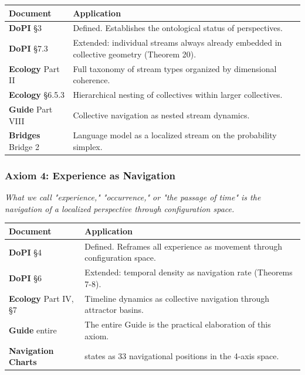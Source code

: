 \begin{longtable}{>{\raggedright\arraybackslash}p{} >{\raggedright\arraybackslash}p{}}
\toprule
\textbf{Document} & \textbf{Application} \\
\midrule
\endhead
\textbf{DoPI} §3 & Defined. Establishes the ontological status of perspectives. \\
\textbf{DoPI} §7.3 & Extended: individual streams always already embedded in collective geometry (Theorem 20). \\
\textbf{Ecology} Part II & Full taxonomy of stream types organized by dimensional coherence. \\
\textbf{Ecology} §6.5.3 & Hierarchical nesting of collectives within larger collectives. \\
\textbf{Guide} Part VIII & Collective navigation as nested stream dynamics. \\
\textbf{Bridges} Bridge 2 & Language model as a localized stream on the probability simplex. \\
\bottomrule
\end{longtable}



\subsubsection*{Axiom 4: Experience as Navigation}


\textit{What we call "experience," "occurrence," or "the passage of time" is the navigation of a localized perspective through configuration space.}



\begin{longtable}{>{\raggedright\arraybackslash}p{} >{\raggedright\arraybackslash}p{}}
\toprule
\textbf{Document} & \textbf{Application} \\
\midrule
\endhead
\textbf{DoPI} §4 & Defined. Reframes all experience as movement through configuration space. \\
\textbf{DoPI} §6 & Extended: temporal density as navigation rate (Theorems 7-8). \\
\textbf{Ecology} Part IV, §7 & Timeline dynamics as collective navigation through attractor basins. \\
\textbf{Guide} entire & The entire Guide is the practical elaboration of this axiom. \\
\textbf{Navigation Charts} & 33 states as 33 navigational positions in the 4-axis space. \\
\bottomrule
\end{longtable}



